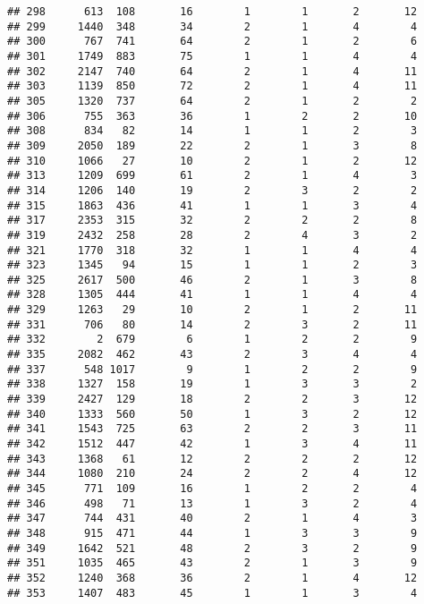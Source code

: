 \documentclass[]{article}
\begin{document}
\begin{verbatim}
## 298      613  108       16        1        1       2       12
## 299     1440  348       34        2        1       4        4
## 300      767  741       64        2        1       2        6
## 301     1749  883       75        1        1       4        4
## 302     2147  740       64        2        1       4       11
## 303     1139  850       72        2        1       4       11
## 305     1320  737       64        2        1       2        2
## 306      755  363       36        1        2       2       10
## 308      834   82       14        1        1       2        3
## 309     2050  189       22        2        1       3        8
## 310     1066   27       10        2        1       2       12
## 313     1209  699       61        2        1       4        3
## 314     1206  140       19        2        3       2        2
## 315     1863  436       41        1        1       3        4
## 317     2353  315       32        2        2       2        8
## 319     2432  258       28        2        4       3        2
## 321     1770  318       32        1        1       4        4
## 323     1345   94       15        1        1       2        3
## 325     2617  500       46        2        1       3        8
## 328     1305  444       41        1        1       4        4
## 329     1263   29       10        2        1       2       11
## 331      706   80       14        2        3       2       11
## 332        2  679        6        1        2       2        9
## 335     2082  462       43        2        3       4        4
## 337      548 1017        9        1        2       2        9
## 338     1327  158       19        1        3       3        2
## 339     2427  129       18        2        2       3       12
## 340     1333  560       50        1        3       2       12
## 341     1543  725       63        2        2       3       11
## 342     1512  447       42        1        3       4       11
## 343     1368   61       12        2        2       2       12
## 344     1080  210       24        2        2       4       12
## 345      771  109       16        1        2       2        4
## 346      498   71       13        1        3       2        4
## 347      744  431       40        2        1       4        3
## 348      915  471       44        1        3       3        9
## 349     1642  521       48        2        3       2        9
## 351     1035  465       43        2        1       3        9
## 352     1240  368       36        2        1       4       12
## 353     1407  483       45        1        1       3        4

\end{verbatim}
\end{document}

